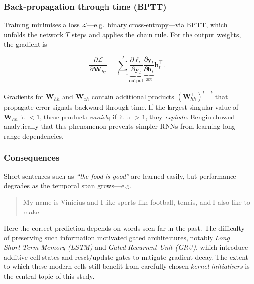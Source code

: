\documentclass[conference]{IEEEtran}
\begin{document}
\subsubsection{Back-propagation through time (BPTT)}

Training minimises a loss $\mathcal{L}$—e.g.\ binary cross-entropy—via
BPTT, which unfolds the network $T$ steps and applies the chain rule.
For the output weights, the gradient is

\begin{equation}
  \frac{\partial\mathcal{L}}{\partial\mathbf{W}_{hy}}
    = \sum_{t=1}^T
      \underbrace{\frac{\partial\ell_t}{\partial\mathbf{y}_t}}_{\text{output}}
      \underbrace{\frac{\partial\mathbf{y}_t}{\partial\mathbf{h}_t}}_{\text{act}}
      \mathbf{h}_t^{\!\top}.                                   \label{eq:grad_wh}
\end{equation}

Gradients for $\mathbf{W}_{hh}$ and $\mathbf{W}_{xh}$ contain additional
products $(\mathbf{W}_{hh}^\top)^{t-k}$ that propagate error signals
backward through time.  If the largest singular value of
$\mathbf{W}_{hh}$ is $<1$, these products \emph{vanish}; if it is $>1$, they
\emph{explode}.  Bengio \cite{bengio1994learning} showed analytically that this
phenomenon prevents simpler RNNs from learning long-range dependencies.

\subsubsection{Consequences}

Short sentences such as
\textit{“the food is good”} are learned easily, but performance degrades as
the temporal span grows—e.g.\

\begin{quote}
My name is Vinicius and I like sports like football, tennis, and I also like
to make \underline{\hspace{2em}}.
\end{quote}

\noindent
Here the correct prediction depends on words seen far in the past.  The
difficulty of preserving such information motivated gated architectures,
notably \emph{Long Short-Term Memory (LSTM)} \cite{hochreiter1997long} and
\emph{Gated Recurrent Unit (GRU)}, which introduce additive cell states and
reset/update gates to mitigate gradient decay.  The extent to which these
modern cells still benefit from carefully chosen \emph{kernel initialisers}
is the central topic of this study.
\end{document}
